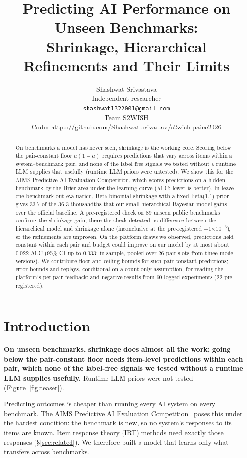 \documentclass{article}
\title{Predicting AI Performance on Unseen Benchmarks:\\
Shrinkage, Hierarchical Refinements and Their Limits}
\author{Shashwat Srivastava\\ Independent researcher\\ \texttt{shashwat1322001@gmail.com}\\ Team S2WISH\\
  Code: \url{https://github.com/Shashwat-srivastav/s2wish-paiec2026}}
\newcommand{\ee}[1]{\ensuremath{\times 10^{-#1}}}
\begin{document}
\maketitle

\begin{abstract}
On benchmarks a model has never seen, shrinkage is the working core. Scoring below the pair-constant floor $a(1-a)$ requires predictions that vary
across items within a system--benchmark pair, and none of the label-free signals we tested without a runtime LLM
supplies that usefully (runtime LLM priors were untested). We show this for the AIMS Predictive AI Evaluation
Competition, which scores predictions on a hidden benchmark by the Brier area under the learning curve (ALC; lower is
better). In leave-one-benchmark-out evaluation, Beta-binomial shrinkage with a fixed Beta(1,1) prior gives 33.7 of
the 36.3 thousandths that our small hierarchical Bayesian model gains over the official baseline. A pre-registered
check on 89 unseen public benchmarks confirms the shrinkage gain; there the check detected no difference between the
hierarchical model and shrinkage alone (inconclusive at the pre-registered $\pm1\ee{3}$), so the refinements are
unproven. On the platform draws we observed, predictions held constant within each pair and budget could improve on
our model by at most about 0.022 ALC (95\% CI up to 0.033; in-sample, pooled over 26 pair-slots from three model
versions). We contribute floor and ceiling bounds for such pair-constant predictions; error bounds and replays,
conditional on a count-only assumption, for reading the platform's per-pair feedback; and negative results from 60
logged experiments (22 pre-registered).
\end{abstract}

\section{Introduction}
\textbf{On unseen benchmarks, shrinkage does almost all the work; going below the pair-constant floor needs item-level predictions within
each pair, which none of the label-free signals we tested without a runtime LLM supplies usefully.} Runtime LLM priors were not tested (Figure~\ref{fig:teaser}).

Predicting outcomes is cheaper than running every AI system on every benchmark. The AIMS Predictive AI Evaluation
Competition~\cite{aims2026,truong2026} poses this under the hardest condition: the benchmark is new, so no system's
responses to its items are known. Item response theory (IRT) methods need exactly those responses
(\S\ref{sec:related}). We therefore built a model that learns only what transfers across benchmarks.
\end{document}
